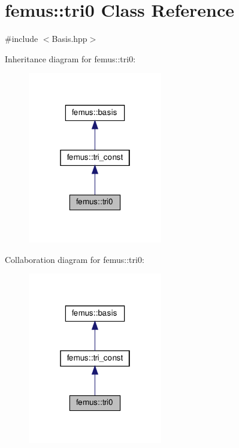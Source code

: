 \hypertarget{classfemus_1_1tri0}{}\section{femus\+:\+:tri0 Class Reference}
\label{classfemus_1_1tri0}


{\ttfamily \#include $<$Basis.\+hpp$>$}



Inheritance diagram for femus\+:\+:tri0\+:
\nopagebreak
\begin{figure}[H]
\begin{center}
\leavevmode
\includegraphics[width=166pt]{classfemus_1_1tri0__inherit__graph}
\end{center}
\end{figure}


Collaboration diagram for femus\+:\+:tri0\+:
\nopagebreak
\begin{figure}[H]
\begin{center}
\leavevmode
\includegraphics[width=166pt]{classfemus_1_1tri0__coll__graph}
\end{center}
\end{figure}
